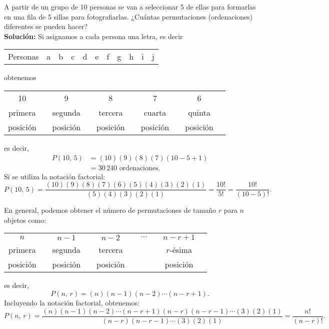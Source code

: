 \begin{myexample}
    A partir de un grupo de 10 personas se van a seleccionar 5 de ellas para formarlas en una fila de 5 sillas para fotografiarlas. ¿Cuántas permutaciones (ordenaciones) diferentes se pueden hacer?\\
    \newline
    \textbf{\color{jblueleft}Solución:} Si asignamos a cada persona una letra, es decir
    \begin{center}
        \begin{tabular}{ccccccccccc}
            Personas & a & b & c & d & e & f & g & h & i & j
        \end{tabular}
    \end{center}
    obtenemos
    \begin{center}
        \begin{tabular}{cccccccccc}
            10 & & 9 & & 8 & & 7 & & 6 \\
            primera & & segunda & & tercera & & cuarta & & quinta \\
            posición & & posición & & posición & & posición & & posición
        \end{tabular}
    \end{center}
    es decir,
    \begin{align*}
        P(10, \, 5) & = (10)(9)(8)(7)(10-5+1) \\ 
        & = 30 \, 240 \text{ ordenaciones.}
    \end{align*}
    Si se utiliza la notación factorial:
    \begin{displaymath}
        P(10, \, 5) = \frac{(10)(9)(8)(7)(6)(5)(4)(3)(2)(1)}{(5)(4)(3)(2)(1)} = \frac{10!}{5!} = \frac{10!}{(10-5)!}.
    \end{displaymath}
\end{myexample}

\begin{obs}{}{}
    En general, podemos obtener el número de permutaciones de tamaño $r$ para $n$ objetos como:
    \begin{center}
        \begin{tabular}{cccccccccc}
            $n$ & & $n-1$ & & $n-2$ & & $\cdots$ & & $n-r+1$ \\
            primera & & segunda & & tercera & &  & & $r$-ésima \\
            posición & & posición & & posición & &  & & posición
        \end{tabular}
    \end{center}
    es decir,
    $$P(n, \, r) = (n)(n-1)(n-2) \cdots (n-r+1).$$
    Incluyendo la notación factorial, obtenemos:
    $$P(n, \, r) = \frac{(n)(n-1)(n-2) \cdots (n-r+1)(n-r)(n-r-1) \cdots (3)(2)(1)}{(n-r)(n-r-1) \cdots (3)(2)(1)} = \frac{n!}{(n-r)!}.$$
\end{obs}

